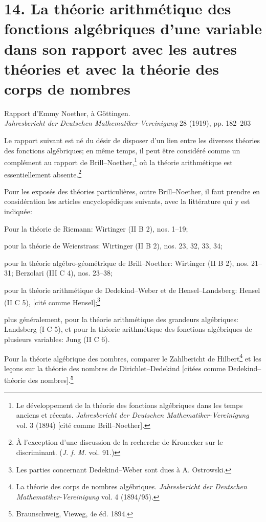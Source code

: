 \section*{14. La théorie arithmétique des fonctions algébriques d'une variable dans son rapport avec les autres théories et avec la théorie des corps de nombres}
\begin{center}
Rapport d'Emmy Noether, à Göttingen.\\[0.5em]
\emph{Jahresbericht der Deutschen Mathematiker-Vereinigung} 28 (1919), pp. 182--203
\end{center}

Le rapport suivant est né du désir de disposer d'un lien entre les diverses théories des fonctions algébriques; en même temps, il peut être considéré comme un complément au rapport de Brill--Noether,\footnote{Le développement de la théorie des fonctions algébriques dans les temps anciens et récents. \emph{Jahresbericht der Deutschen Mathematiker-Vereinigung} vol. 3 (1894) [cité comme Brill--Noether].} où la théorie arithmétique est essentiellement absente.\footnote{À l'exception d'une discussion de la recherche de Kronecker sur le discriminant. (\emph{J. f. M.} vol. 91.)}

Pour les exposés des théories particulières, outre Brill--Noether, il faut prendre en considération les articles encyclopédiques suivants, avec la littérature qui y est indiquée:

Pour la théorie de Riemann: Wirtinger (II B 2), nos. 1--19;

pour la théorie de Weierstrass: Wirtinger (II B 2), nos. 23, 32, 33, 34;

pour la théorie algébro-géométrique de Brill--Noether: Wirtinger (II B 2), nos. 21--31; Berzolari (III C 4), nos. 23--38;

pour la théorie arithmétique de Dedekind--Weber et de Hensel--Landsberg: Hensel (II C 5), [cité comme Hensel];\footnote{Les parties concernant Dedekind--Weber sont dues à A. Ostrowski.}

plus généralement, pour la théorie arithmétique des grandeurs algébriques: Landsberg (I C 5), et pour la théorie arithmétique des fonctions algébriques de plusieurs variables: Jung (II C 6).

Pour la théorie algébrique des nombres, comparer le \og{}Zahlbericht\fg{} de Hilbert\footnote{La théorie des corps de nombres algébriques. \emph{Jahresbericht der Deutschen Mathematiker-Vereinigung} vol. 4 (1894/95).} et les leçons sur la théorie des nombres de Dirichlet--Dedekind [citées comme Dedekind--théorie des nombres].\footnote{Braunschweig, Vieweg, 4e éd. 1894.}

